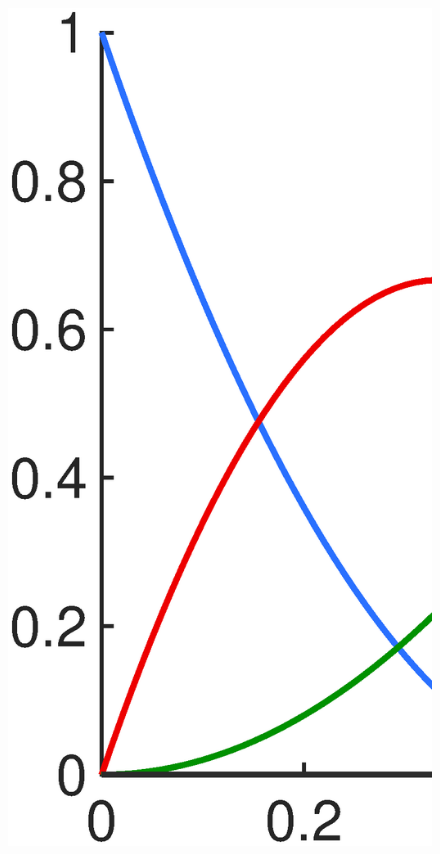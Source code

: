 \documentclass[3p,preprint,12pt]{elsarticle}
\begin{document}

\begin{figure}
	\centering
	\begin{minipage}{.45\textwidth}
		\graphicspath{{./All_Images/}}
		\centering
		\includegraphics[width=\linewidth]{Quadratic.eps}

\end{minipage}
\end{figure}
\end{document}
